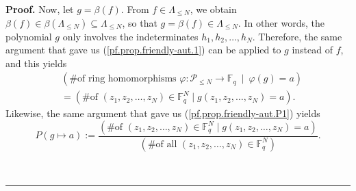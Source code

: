 \documentclass[numbers=enddot,12pt,final,onecolumn,notitlepage]{scrartcl}%
\theoremstyle{definition}
\newenvironment{proof}[1][Proof]{\noindent\textbf{#1.} }{\ \rule{0.5em}{0.5em}}
\renewcommand{\leq}{\leqslant}
\theoremstyle{plainsl}
\begin{document}
\begin{proof}
Now, let $g=\beta\left(  f\right)  $. From $f\in\Lambda_{\leq N}$, we obtain
$\beta\left(  f\right)  \in\beta\left(  \Lambda_{\leq N}\right)
\subseteq\Lambda_{\leq N}$, so that $g=\beta\left(  f\right)  \in\Lambda_{\leq
N}$. In other words, the polynomial $g$ only involves the indeterminates
$h_{1},h_{2},\ldots,h_{N}$. Therefore, the same argument that gave us
(\ref{pf.prop.friendly-aut.1}) can be applied to $g$ instead of $f$, and this
yields%
\begin{align}
& \left(  \text{\# of ring homomorphisms }\varphi:\mathcal{P}_{\leq
N}\rightarrow\mathbb{F}_{q}\ \mid\ \varphi\left(  g\right)  =a\right)
\nonumber\\
& =\left(  \text{\# of }\left(  z_{1},z_{2},\ldots,z_{N}\right)  \in
\mathbb{F}_{q}^{N}\mid g\left(  z_{1},z_{2},\ldots,z_{N}\right)  =a\right)
.\label{pf.prop.friendly-aut.2}%
\end{align}
Likewise, the same argument that gave us (\ref{pf.prop.friendly-aut.P1})
yields%
\begin{equation}
P\left(  g\mapsto a\right)  :=\dfrac{\left(  \text{\# of }\left(  z_{1}%
,z_{2},\ldots,z_{N}\right)  \in\mathbb{F}_{q}^{N}\mid g\left(  z_{1}%
,z_{2},\ldots,z_{N}\right)  =a\right)  }{\left(  \text{\# of all }\left(
z_{1},z_{2},\ldots,z_{N}\right)  \in\mathbb{F}_{q}^{N}\right)  }%
.\label{pf.prop.friendly-aut.P2}%
\end{equation}



\end{proof}
\end{document}
